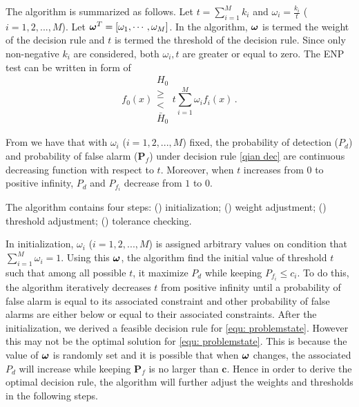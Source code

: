 The algorithm is summarized as follows. Let $t = \sum_{i=1}^{M}k_i$ and $\omega_i = \frac{k_i}{t}$ ($i=1, 2, ..., M$).
Let $\boldsymbol{\omega}^T = [\omega_1, \cdots, \omega_M]$. 
In the algorithm, $\boldsymbol{\omega}$ is termed the weight of the decision rule and $t$ is termed the threshold of the decision rule. Since only non-negative $k_i$ are considered, both $\omega_i, t$ are greater or equal to zero. The ENP test can be written in form of 
\begin{equation}
\label{qian dec}
f_0(x) \substack{H_0 \\ \geq \\ < \\ \bar{H}_0} t\sum_{i=1}^{M}\omega_if_i(x)\,.
\end{equation}

From \cite{zhang2000efficient} we have that with $\omega_i$ ($i=1, 2, ..., M$) fixed, the probability of detection ($P_d$) and probability of false alarm ($\mathbf{P}_f$) under decision rule \eqref{qian dec} are continuous decreasing function with respect to $t$. 
Moreover, when $t$ increases from $0$ to positive infinity, $P_d$ and $P_{f_i}$ decrease from $1$ to $0$.

The algorithm contains four steps: () initialization; () weight adjustment; () threshold adjustment; () tolerance checking.

In initialization, $\omega_i$ ($i=1, 2, ..., M$)  is assigned arbitrary values on condition that $\sum_{i=1}^{M}\omega_i = 1$. Using this $\boldsymbol{\omega}$, the algorithm find the initial value of threshold $t$ such that among all possible $t$, it maximize $P_d$ while keeping $P_{f_i} \leq c_i$. 
To do this, the algorithm iteratively decreases $t$ from positive infinity until a probability of false alarm is equal to its associated constraint and other probability of false alarms are either below or equal to their associated constraints.   
After the initialization, we derived a feasible decision rule for \eqref{equ: problemstate}. However this may not be the optimal solution for \eqref{equ: problemstate}. This is because the value of $\boldsymbol{\omega}$ is randomly set and it is possible that when $\boldsymbol{\omega}$ changes, the associated $P_d$ will increase while keeping $\mathbf{P}_f$ is no larger than $\mathbf{c}$. Hence in order to derive the optimal decision rule, the algorithm will further adjust the weights and thresholds in the following steps. 


